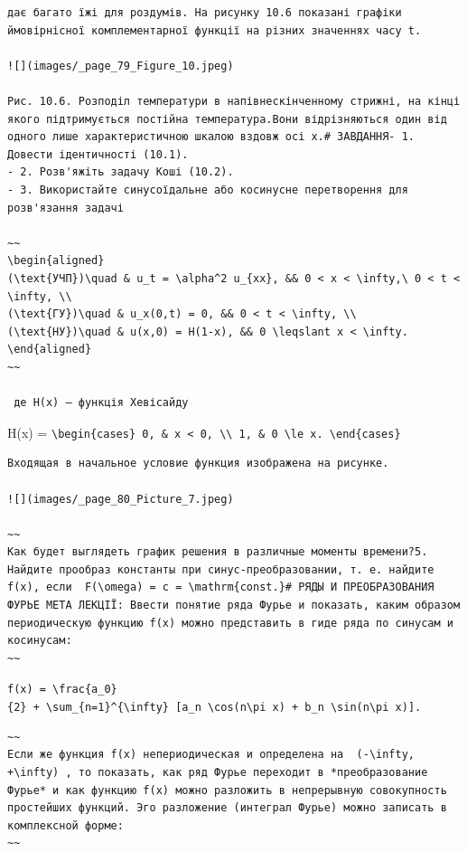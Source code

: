 \documentclass[
  ukrainian,
]{article}
\begin{document}
\begin{verbatim}
дає багато їжі для роздумів. На рисунку 10.6 показані графіки ймовірнісної комплементарної функції на різних значеннях часу t.

![](images/_page_79_Figure_10.jpeg)

Рис. 10.6. Розподіл температури в напівнескінченному стрижні, на кінці якого підтримується постійна температура.Вони відрізняються один від одного лише характеристичною шкалою вздовж осі x.# ЗАВДАННЯ- 1. Довести ідентичності (10.1).
- 2. Розв'яжіть задачу Коші (10.2).
- 3. Використайте синусоїдальне або косинусне перетворення для розв'язання задачі 

~~
\begin{aligned}
(\text{УЧП})\quad & u_t = \alpha^2 u_{xx}, && 0 < x < \infty,\ 0 < t < \infty, \\
(\text{ГУ})\quad & u_x(0,t) = 0, && 0 < t < \infty, \\
(\text{НУ})\quad & u(x,0) = H(1-x), && 0 \leqslant x < \infty.
\end{aligned}
~~

 де H(x) — функція Хевісайду
\end{verbatim}

H(x) =
\texttt{\textbackslash{}begin\{cases\}\ 0,\ \&\ x\ \textless{}\ 0,\ \textbackslash{}\textbackslash{}\ 1,\ \&\ 0\ \textbackslash{}le\ x.\ \textbackslash{}end\{cases\}}

\begin{verbatim}
Входящая в начальное условие функция изображена на рисунке.

![](images/_page_80_Picture_7.jpeg)

~~
Как будет выглядеть график решения в различные моменты времени?5. Найдите прообраз константы при синус-преобразовании, т. е. найдите f(x), если  F(\omega) = c = \mathrm{const.}# РЯДЫ И ПРЕОБРАЗОВАНИЯ ФУРЬЕ МЕТА ЛЕКЦІЇ: Ввести понятие ряда Фурье и показать, каким образом периодическую функцию f(x) можно представить в гиде ряда по синусам и косинусам:
~~
\end{verbatim}

\texttt{f(x)\ =\ \textbackslash{}frac\{a\_0\}\{2\}\ +\ \textbackslash{}sum\_\{n=1\}\^{}\{\textbackslash{}infty\}\ {[}a\_n\ \textbackslash{}cos(n\textbackslash{}pi\ x)\ +\ b\_n\ \textbackslash{}sin(n\textbackslash{}pi\ x){]}.}

\begin{verbatim}
~~
Если же функция f(x) непериодическая и определена на  (-\infty, +\infty) , то показать, как ряд Фурье переходит в *преобразование Фурье* и как функцию f(x) можно разложить в непрерывную совокупность простейших функций. Эго разложение (интеграл Фурье) можно записать в комплексной форме:
~~
\end{verbatim}
\end{document}
